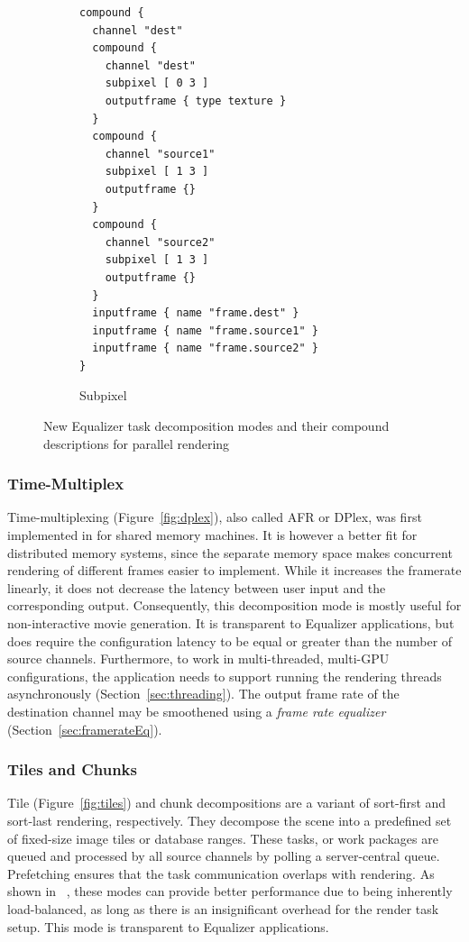 \documentclass[10pt,journal,compsoc]{IEEEtran}
\newcommand{\sref}[1]{Section~\ref{#1}}
\newcommand{\fig}[1]{Figure~\ref{#1}}
\begin{document}
\begin{figure}[ht]
\begin{subfigure}[t]{0.24\textwidth}
{\begin{lstlisting}
compound {
  channel "dest"
  compound {
    channel "dest"
    subpixel [ 0 3 ]
    outputframe { type texture }
  }
  compound {
    channel "source1"
    subpixel [ 1 3 ]
    outputframe {}
  }
  compound {
    channel "source2"
    subpixel [ 1 3 ]
    outputframe {}
  }
  inputframe { name "frame.dest" }
  inputframe { name "frame.source1" }
  inputframe { name "frame.source2" }
}
    \end{lstlisting}\vspace{21ex}}
    \caption{\label{fig:subpixel}Subpixel}
  \end{subfigure}
  \caption{New \textsf{Equalizer} task decomposition modes and their compound
descriptions for parallel rendering}
  \label{fig:compounds}
\end{figure}


\subsubsection{Time-Multiplex}

Time-multiplexing (\fig{fig:dplex}), also called AFR or DPlex, was first
implemented in \cite{BRE:05} for shared memory machines. It is however a better
fit for distributed memory systems, since the separate memory space makes
concurrent rendering of different frames easier to implement. While it increases
the framerate linearly, it does not decrease the latency between user input and
the corresponding output. Consequently, this decomposition mode is mostly useful
for non-interactive movie generation. It is transparent to \textsf{Equalizer}
applications, but does require the configuration latency to be equal or greater
than the number of source channels. Furthermore, to work in multi-threaded,
multi-GPU configurations, the application needs to support running the rendering
threads asynchronously (\sref{sec:threading}). The output frame rate of the
destination channel may be smoothened using a {\em frame rate equalizer}
(\sref{sec:framerateEq}).

\subsubsection{Tiles and Chunks}\label{sec:tile}

Tile (\fig{fig:tiles}) and chunk decompositions are a variant of sort-first and
sort-last rendering, respectively. They decompose the scene into a predefined
set of fixed-size image tiles or database ranges. These tasks, or work packages are queued and
processed by all source channels by polling a server-central queue. Prefetching
ensures that the task communication overlaps with rendering. As shown in~
\cite{SPEP:16}, these modes can provide better performance due to being inherently
load-balanced, as long as there is an insignificant overhead for the render task
setup. This mode is transparent to \textsf{Equalizer} applications.
\end{document}
